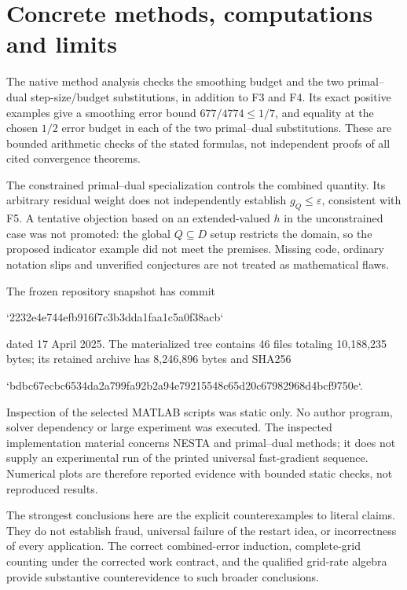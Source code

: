 \documentclass[10pt]{article}
\begin{document}
\section*{Concrete methods, computations and limits}
The native method analysis checks the smoothing budget and the two primal–dual step-size/budget substitutions, in addition to F3 and F4. Its exact positive examples give a smoothing error bound \(677/4774\le1/7\), and equality at the chosen \(1/2\) error budget in each of the two primal–dual substitutions. These are bounded arithmetic checks of the stated formulas, not independent proofs of all cited convergence theorems.\par
The constrained primal–dual specialization controls the combined quantity. Its arbitrary residual weight does not independently establish \(g_Q\le\varepsilon\), consistent with F5. A tentative objection based on an extended-valued \(h\) in the unconstrained case was not promoted: the global \(Q\subseteq D\) setup restricts the domain, so the proposed indicator example did not meet the premises. Missing code, ordinary notation slips and unverified conjectures are not treated as mathematical flaws.\par
The frozen repository snapshot has commit\par
`2232e4e744efb916f7c3b3dda1faa1c5a0f38acb`\par
dated 17 April 2025. The materialized tree contains 46 files totaling 10,188,235 bytes; its retained archive has 8,246,896 bytes and SHA256\par
`bdbc67ecbc6534da2a799fa92b2a94e79215548c65d20c67982968d4bcf9750e`.\par
Inspection of the selected MATLAB scripts was static only. No author program, solver dependency or large experiment was executed. The inspected implementation material concerns NESTA and primal–dual methods; it does not supply an experimental run of the printed universal fast-gradient sequence. Numerical plots are therefore reported evidence with bounded static checks, not reproduced results.\par
The strongest conclusions here are the explicit counterexamples to literal claims. They do not establish fraud, universal failure of the restart idea, or incorrectness of every application. The correct combined-error induction, complete-grid counting under the corrected work contract, and the qualified grid-rate algebra provide substantive counterevidence to such broader conclusions.\par
\end{document}
